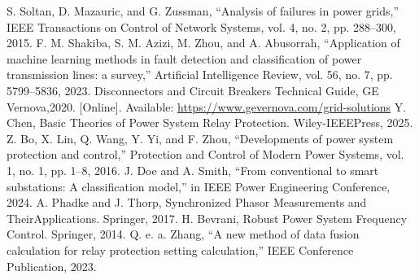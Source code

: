 S. Soltan, D. Mazauric, and G. Zussman, “Analysis of failures in power grids,” IEEE
Transactions on Control of Network Systems, vol. 4, no. 2, pp. 288–300, 2015.
F. M. Shakiba, S. M. Azizi, M. Zhou, and A. Abusorrah, “Application of machine learning
methods in fault detection and classification of power transmission lines: a survey,”
Artificial Intelligence Review, vol. 56, no. 7, pp. 5799–5836, 2023.
Disconnectors and Circuit Breakers Technical Guide, GE Vernova,2020. [Online]. Available:
\url{https://www.gevernova.com/grid-solutions}
Y. Chen, Basic Theories of Power System Relay Protection. Wiley-IEEEPress, 2025.
Z. Bo, X. Lin, Q. Wang, Y. Yi, and F. Zhou, “Developments of power system protection and
control,” Protection and Control of Modern Power Systems, vol. 1, no. 1, pp. 1–8, 2016.
J. Doe and A. Smith, “From conventional to smart substations: A classification model,” in
IEEE Power Engineering Conference, 2024.
A. Phadke and J. Thorp, Synchronized Phasor Measurements and TheirApplications. Springer,
2017.
H. Bevrani, Robust Power System Frequency Control. Springer, 2014.
Q. e. a. Zhang, “A new method of data fusion calculation for relay protection setting
calculation,” IEEE Conference Publication, 2023.
